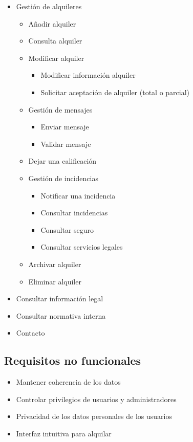 \documentclass[11pt,spanish]{article} %
\begin{document}
\begin{itemize}
	\item Gestión de alquileres
	\begin{itemize}
		\item Añadir alquiler
		\item Consulta alquiler
		\item Modificar alquiler
		\begin{itemize}
			\item Modificar información alquiler
			\item Solicitar aceptación de alquiler (total o parcial)
		\end{itemize}
		\item Gestión de mensajes
		\begin{itemize}
			\item Enviar mensaje
			\item Validar mensaje
		\end{itemize}
		\item Dejar una calificación
		\item Gestión de incidencias
		\begin{itemize}
			\item Notificar una incidencia 
			\item Consultar incidencias
			\item Consultar seguro
			\item Consultar servicios legales		
		\end{itemize}
		\item Archivar alquiler
		\item Eliminar alquiler
	\end{itemize}
	
	\item Consultar información legal
	\item Consultar normativa interna
	\item Contacto
	
\end{itemize}

\subsection{Requisitos no funcionales}
\begin{itemize}
	\item Mantener coherencia de los datos
	\item Controlar privilegios de usuarios y administradores
	\item Privacidad de los datos personales de los usuarios
	\item Interfaz intuitiva para alquilar	
\end{itemize}
\end{document}
